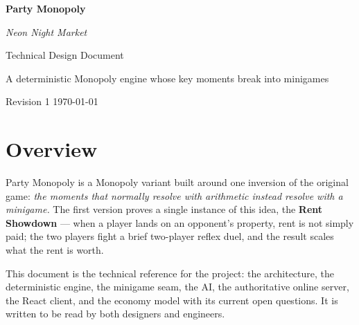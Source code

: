 \documentclass[11pt,a4paper]{article}
\begin{document}
\begin{titlepage}
\centering
\vspace*{3cm}
{\Huge\bfseries\color{accent} Party Monopoly\par}
\vspace{0.4cm}
{\large\itshape Neon Night Market\par}
\vspace{1.2cm}
{\LARGE Technical Design Document\par}
\vspace{0.6cm}
{\large A deterministic Monopoly engine whose key moments break into minigames\par}
\vspace{2cm}
\vfill
{\small Revision 1 \quad\textbullet\quad \today\par}
\end{titlepage}

\tableofcontents
\newpage

\section{Overview}

Party Monopoly is a Monopoly variant built around one inversion of the
original game: \emph{the moments that normally resolve with arithmetic instead
resolve with a minigame.} The first version proves a single instance of this
idea, the \textbf{Rent Showdown} --- when a player lands on an opponent's
property, rent is not simply paid; the two players fight a brief two-player
reflex duel, and the result scales what the rent is worth.

This document is the technical reference for the project: the architecture, the
deterministic engine, the minigame seam, the AI, the authoritative online
server, the React client, and the economy model with its current open
questions. It is written to be read by both designers and engineers.
\end{document}
